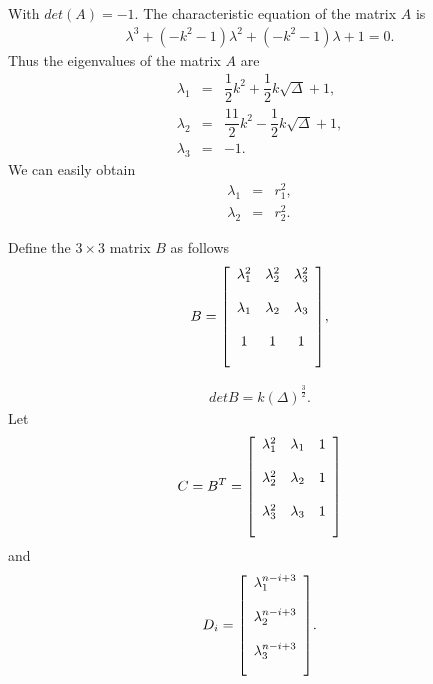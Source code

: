With $det (A)= -1$. The characteristic equation of the matrix $A$ is  
\begin{align*}
\lambda^3 + (-k^2-1)\lambda^2+(-k^2-1)\lambda +1 = 0.
\end{align*}
Thus the eigenvalues of the matrix $A$ are 
\begin{align*}
\lambda_1 & = & \dfrac{1}{2} k^2 + \dfrac{1}{2} k\sqrt{\Delta}+1,\\
\lambda_2 & = & \dfrac{11}{2} k^2 - \dfrac{1}{2} k\sqrt{\Delta}+1,\\
\lambda_3& = & -1.
\end{align*}
We can easily obtain
\begin{align*}
\lambda_1 & = & r_1^2,\\
\lambda_2 & = & r_2^2.
\end{align*}
\begin{definition}
Define the $3\times 3$ matrix $B$ as follows
\begin{align*}
B = {\left[
          \begin{array}{ccc}
           \bigskip
            \lambda_1^2 & \lambda_2^2& \lambda_3^2 \\
             \bigskip
            \lambda_1 & \lambda_2 & \lambda_3 \\
             \bigskip
            1 & 1 &1\\
          \end{array}
        \right]},
\end{align*}
\end{definition}
\begin{align*}
det B = k(\Delta)^{\frac{3}{2}}.
\end{align*}
Let
\begin{align*}
C = B^T = {\left[
          \begin{array}{ccc}
           \bigskip
            \lambda_1^2 & \lambda_1& 1 \\
             \bigskip
            \lambda_2^2 & \lambda_2 & 1 \\
             \bigskip
            \lambda_3^2 & \lambda_3 &1\\
          \end{array}
        \right]}
\end{align*}
and
\begin{align*}
D_i = {\left[
          \begin{array}{c}
           \bigskip
            \lambda_1^{n-i+3}  \\
             \bigskip
            \lambda_2^{n-i+3} \\
             \bigskip
            \lambda_3^{n-i+3} \\
          \end{array}
        \right]}.
\end{align*}
